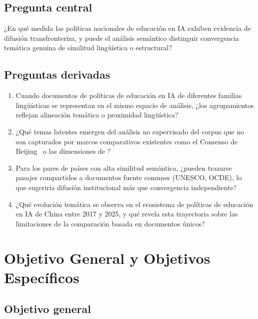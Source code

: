 \subsection{Pregunta central}
\label{subsec:pregunta-central}

¿En qué medida las políticas nacionales de educación en IA exhiben evidencia de difusión transfronteriza, y puede el análisis semántico distinguir convergencia temática genuina de similitud lingüística o estructural?

\subsection{Preguntas derivadas}
\label{subsec:preguntas-derivadas}

\begin{enumerate}
  \item Cuando documentos de políticas de educación en IA de diferentes familias lingüísticas se representan en el mismo espacio de análisis, ¿los agrupamientos reflejan alineación temática o proximidad lingüística?

  \item ¿Qué temas latentes emergen del análisis no supervisado del corpus que no son capturados por marcos comparativos existentes como el Consenso de Beijing~\citep{unesco2019beijing} o las dimensiones de \citet{miao2021guidance}?

  \item Para los pares de países con alta similitud semántica, ¿pueden trazarse pasajes compartidos a documentos fuente comunes (UNESCO, OCDE), lo que sugeriría difusión institucional más que convergencia independiente?

  \item ¿Qué evolución temática se observa en el ecosistema de políticas de educación en IA de China entre 2017 y 2025, y qué revela esta trayectoria sobre las limitaciones de la comparación basada en documentos únicos?
\end{enumerate}


\section{Objetivo General y Objetivos Específicos}
\label{sec:objetivos}

\subsection{Objetivo general}
\label{subsec:objetivo-general}

